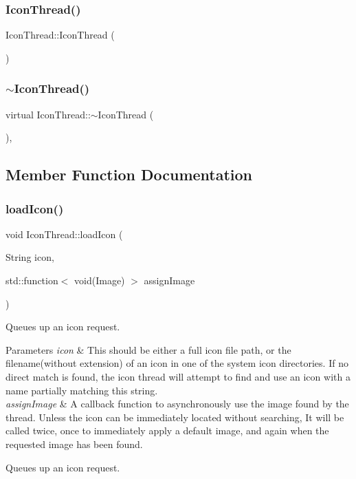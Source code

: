 \subsubsection{\texorpdfstring{Icon\+Thread()}{IconThread()}}
{\footnotesize\ttfamily Icon\+Thread\+::\+Icon\+Thread (\begin{DoxyParamCaption}{ }\end{DoxyParamCaption})}

\mbox{\label{classIconThread_abcbf5265504acb501d46f393bc421b0f}} 
\subsubsection{\texorpdfstring{$\sim$\+Icon\+Thread()}{~IconThread()}}
{\footnotesize\ttfamily virtual Icon\+Thread\+::$\sim$\+Icon\+Thread (\begin{DoxyParamCaption}{ }\end{DoxyParamCaption})\hspace{0.3cm}{\ttfamily [inline]}, {\ttfamily [virtual]}}



\subsection{Member Function Documentation}
\mbox{\label{classIconThread_a508dad34417fb3767781191654fb7acb}} 
\subsubsection{\texorpdfstring{load\+Icon()}{loadIcon()}}
{\footnotesize\ttfamily void Icon\+Thread\+::load\+Icon (\begin{DoxyParamCaption}\item[{String}]{icon,  }\item[{std\+::function$<$ void(Image) $>$}]{assign\+Image }\end{DoxyParamCaption})}

Queues up an icon request. ~\newline
 
\begin{DoxyParams}{Parameters}
{\em icon} & This should be either a full icon file path, or the filename(without extension) of an icon in one of the system icon directories. If no direct match is found, the icon thread will attempt to find and use an icon with a name partially matching this string.\\
\hline
{\em assign\+Image} & A callback function to asynchronously use the image found by the thread. Unless the icon can be immediately located without searching, It will be called twice, once to immediately apply a default image, and again when the requested image has been found.\\
\hline
\end{DoxyParams}
Queues up an icon request. 

